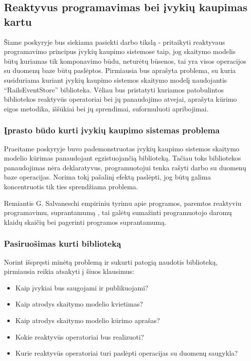 \subsection{Reaktyvus programavimas bei įvykių kaupimas kartu}

Šiame poskyryje bus siekiama pasiekti darbo tikslą - pritaikyti reaktyvaus programavimo principus įvykių kaupimo sistemose taip, jog skaitymo modelis būtų kuriamas tik komponavimo būdu, neturėtų būsenos, tai yra visos operacijos su duomenų baze būtų paslėptos. Pirmiausia bus aprašyta problema, su kuria susiduriama kuriant įvykių kaupimo sistemos skaitymo modelį naudojantis ``RailsEventStore'' biblioteka. Vėliau bus pristatyti kuriamos patobulintos bibliotekos reaktyvūs operatoriai bei jų panaudojimo atvejai, aprašyta kūrimo eigos metodika, iššūkiai bei jų sprendimai, suformuluoti apribojimai.

\subsubsection{Įprasto būdo kurti įvykių kaupimo sistemas problema}

Praeitame poskyryje buvo pademonstruotas įvykių kaupimo sistemos skaitymo modelio kūrimas panaudojant egzistuojančią biblioteką. Tačiau toks bibliotekos panaudojimas nėra deklaratyvus, programuotojui tenka rašyti darbo su duomenų baze operacijas. Norima tokį pašalinį efektą paslėpti, jog būtų galima koncentruotis tik ties sprendžiama problema.

Remiantis G. Salvaneschi empiriniu tyrimu apie programos, paremtos reaktyviu programavimu, suprantamumą \cite{Salvaneschi:2014:ESP:2635868.2635895}, tai galėtų sumažinti programuotojo daromų klaidų skaičių bei pagerinti programos suprantamumą.

\subsubsection{Pasiruošimas kurti biblioteką}

Norint išspręsti minėtą problemą ir sukurti patogią naudotis biblioteką, pirmiausia reikia atsakyti į šiuos klausimus:

\begin{itemize}
  \item Kaip įvykiai bus saugojami ir publikuojami?
  \item Kaip atrodys skaitymo modelio kvietimas?
  \item Kaip atrodys skaitymo modelio kūrimo aprašas?
  \item Kokie reaktyvūs operatoriai bus realizuoti?
  \item Kurie reaktyvūs operatoriai turi paslėpti operacijas su duomenų saugykla?
\end{itemize}

